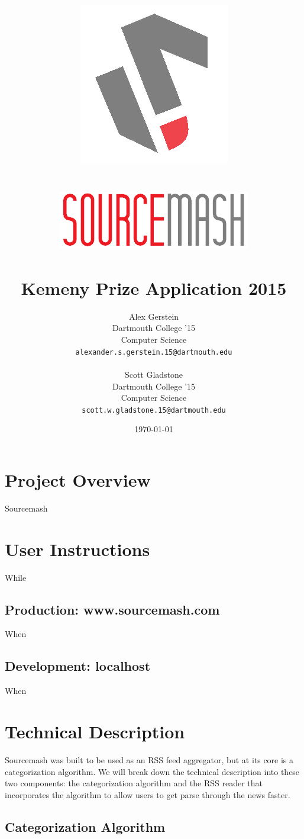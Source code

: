 \documentclass[11pt]{article}
\title{\includegraphics[scale=0.65]{solologo} \\~\\ \includegraphics[scale=0.75]{logotext} \\~\\ Kemeny Prize Application 2015}
\author{
	Alex Gerstein \\ Dartmouth College '15 \\ Computer Science \\ \texttt{alexander.s.gerstein.15@dartmouth.edu}
	\\ \\
	Scott Gladstone \\ Dartmouth College '15 \\ Computer Science \\ \texttt{scott.w.gladstone.15@dartmouth.edu}
	}
\date{\today}
\begin{document}
\maketitle


\pagebreak
\section{Project Overview}

Sourcemash


\section{User Instructions}

While

\subsection{Production: www.sourcemash.com}

When

\subsection{Development: localhost}

When


\section{Technical Description}

Sourcemash was built to be used as an RSS feed aggregator, but at its core is a categorization algorithm. We will break down the technical description into these two components: the categorization algorithm and the RSS reader that incorporates the algorithm to allow users to get parse through the news faster.

\subsection{Categorization Algorithm}
\end{document}
